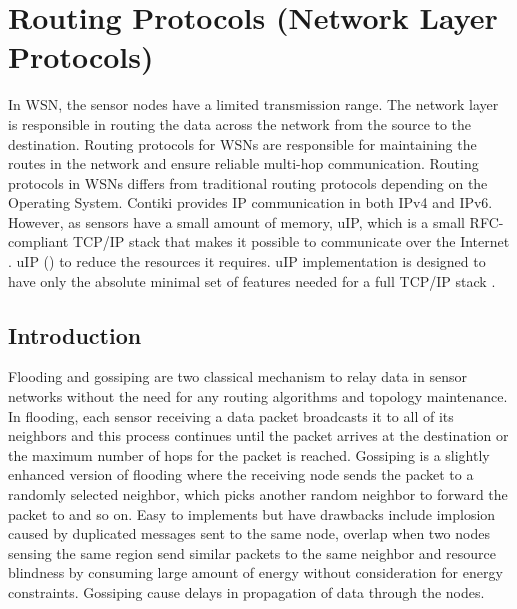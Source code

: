 

\section{Routing Protocols (Network Layer Protocols)}
In WSN, the sensor nodes have a limited transmission range.
The network layer is responsible in routing the data across the network from the source to the destination.
Routing protocols for WSNs are responsible for maintaining the routes in the network and ensure reliable multi-hop communication.
Routing protocols in WSNs differs from traditional routing protocols depending on the Operating System.
Contiki provides IP communication in both IPv4 and IPv6. However, as sensors have a small amount of memory, uIP, which is a small RFC-compliant TCP/IP stack that makes it possible to communicate over the Internet \cite{contikiDoc, contikiUIP}. uIP () to reduce the resources it requires.
uIP implementation is designed to have only the absolute minimal set of features needed for a full TCP/IP stack \cite{contikiDoc, contikiUIP}.

\subsection{Introduction}
Flooding and gossiping are two classical mechanism to relay data in sensor networks without the need for any routing algorithms and topology maintenance. In flooding, each sensor receiving a data packet broadcasts it to all of its neighbors and this process continues until the packet arrives at the destination or the maximum number of hops for the packet is reached. Gossiping is a slightly enhanced version of flooding where the receiving node sends the packet to a randomly selected neighbor, which picks another random neighbor to forward the packet to and so on. Easy to implements but have drawbacks include implosion caused by duplicated messages sent to the same node, overlap when two nodes sensing the same region send similar packets to the same neighbor and resource blindness by consuming large amount of energy without consideration for energy constraints. Gossiping cause delays in propagation of data through the nodes. \cite{akkaya2005survey} 


